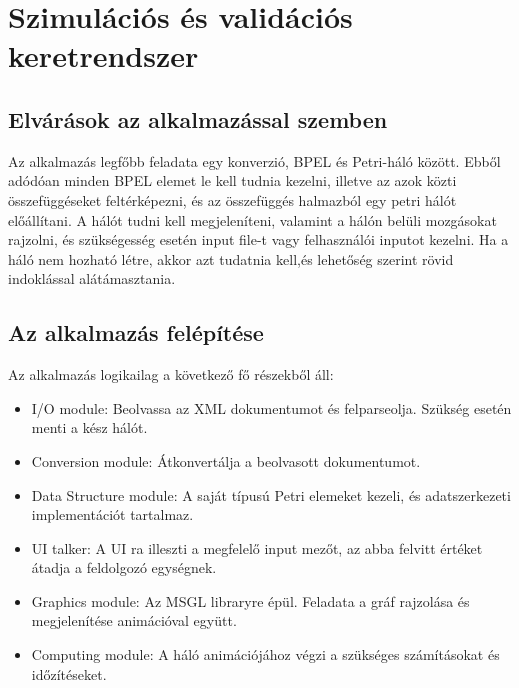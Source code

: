 \chapter{Szimulációs és validációs keretrendszer}
\section{Elvárások az alkalmazással szemben}

Az alkalmazás legfőbb feladata egy konverzió, BPEL és Petri-háló között. Ebből adódóan minden BPEL elemet le kell tudnia kezelni, illetve az azok közti összefüggéseket feltérképezni, és az összefüggés halmazból egy petri hálót előállítani. A hálót tudni kell megjeleníteni, valamint a hálón belüli mozgásokat rajzolni, és szükségesség esetén input file-t vagy felhasználói inputot kezelni. Ha a háló nem hozható létre, akkor azt tudatnia kell,és lehetőség szerint rövid indoklással alátámasztania. 

\section{Az alkalmazás felépítése}

Az alkalmazás logikailag a következő fő részekből áll:
\begin{itemize}
\item I/O module: Beolvassa az XML dokumentumot és felparseolja. Szükség esetén menti a kész hálót.
\item Conversion module: Átkonvertálja  a beolvasott dokumentumot.
\item Data Structure module: A saját típusú Petri elemeket kezeli, és adatszerkezeti implementációt tartalmaz. 
\item UI talker: A UI ra illeszti a megfelelő input mezőt, az abba felvitt értéket átadja a feldolgozó egységnek.
\item Graphics module: Az MSGL libraryre épül. Feladata a gráf rajzolása és megjelenítése animációval együtt. 
\item Computing module: A háló animációjához végzi a szükséges számításokat és időzítéseket. 
\end{itemize}

